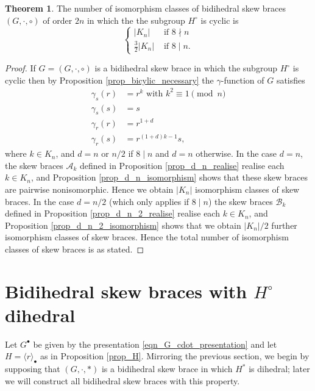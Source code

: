 \documentclass[reqno]{amsart}
\theoremstyle{definition}
\newtheorem{theorem}{Theorem}[section]
\begin{document}
\begin{theorem} \label{thm_bicyclic_count}
The number of isomorphism classes of bidihedral skew braces $ (G,\cdot,\circ) $ of order $ 2n $ in which the the subgroup $ H^{\circ} $ is cyclic is
\[ \left\{ \begin{array}{ll} 
|K_{n}| & \mbox{ if } 8 \nmid n \\
\frac{3}{2} |K_{n}| & \mbox{ if } 8 \mid n.
\end{array} \right. \]
\end{theorem}
\begin{proof}
If $ G=(G,\cdot,\circ) $ is a bidihedral skew brace in which the subgroup $ H^{\circ} $ is cyclic then by Proposition \ref{prop_bicylic_necessary} the $ \gamma $-function of $ G $ satisfies 
\begin{align*}
\gamma_{s}(r) &= r^{k} \mbox{ with } k^{2} \equiv 1 \pmod{n} \\
\gamma_{s}(s) &= s \\
\gamma_{r}(r) &= r^{1+d} \\
\gamma_{r}(s) &= r^{(1+d)k-1}s,
\end{align*}
where $ k \in K_{n} $, and $ d=n $ or $ n/2 $ if $ 8 \mid n $ and $ d=n $ otherwise. In the case $ d=n $, the skew braces $ \mathscr{A}_{k} $ defined in Proposition \ref{prop_d_n_realise} realise each $ k \in K_{n} $, and Proposition \ref{prop_d_n_isomorphism} shows that these skew braces are pairwise nonisomorphic. Hence we obtain $ |K_{n}| $ isomorphism classes of skew braces. In the case $ d = n/2 $ (which only applies if $ 8 \mid n $) the skew braces $ \mathscr{B}_{k} $ defined in Proposition \ref{prop_d_n_2_realise} realise each $ k \in K_{n} $, and Proposition \ref{prop_d_n_2_isomorphism} shows that we obtain $ |K_{n}|/2 $ further isomorphism classes of skew braces. Hence the total number of isomorphism classes of skew braces is as stated. 
\end{proof}

\section{Bidihedral skew braces with $ H^{\circ} $ dihedral} \label{sec_H_dihedral}

Let $ G^{\bullet} $ be given by the presentation \eqref{eqn_G_cdot_presentation} and let $ H = \langle r \rangle_{\bullet} $ as in Proposition \ref{prop_H}. Mirroring the previous section, we begin by supposing that $ (G,\cdot,\ast) $ is a bidihedral skew brace in which $ H^{\ast} $ is dihedral; later we will construct all bidihedral skew braces with this property. 
\end{document}
